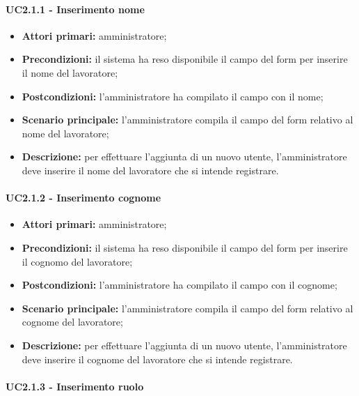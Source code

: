 \paragraph{UC2.1.1 - Inserimento nome}
\begin{itemize}
	\item 	\textbf{Attori primari:} amministratore;
	\item 	\textbf{Precondizioni:} il sistema ha reso disponibile il campo del form per inserire il nome del lavoratore;
	\item 	\textbf{Postcondizioni:} l'amministratore ha compilato il campo con il nome;
	\item 	\textbf{Scenario principale:} l'amministratore compila il campo del form relativo al nome del lavoratore;
	\item 	\textbf{Descrizione:} per effettuare l'aggiunta di un nuovo utente, l'amministratore deve inserire il nome del lavoratore che si intende registrare.

\end{itemize}

\paragraph{UC2.1.2 - Inserimento cognome}

\begin{itemize}
	\item 	\textbf{Attori primari:} amministratore;
	\item 	\textbf{Precondizioni:} il sistema ha reso disponibile il campo del form per inserire il cognomo del lavoratore;
	\item 	\textbf{Postcondizioni:} l'amministratore ha compilato il campo con il cognome;
	\item 	\textbf{Scenario principale:} l'amministratore compila il campo del form relativo al cognome del lavoratore;
	\item 	\textbf{Descrizione:} per effettuare l'aggiunta di un nuovo utente, l'amministratore deve inserire il cognome del lavoratore che si intende registrare.
	
\end{itemize}

\paragraph{UC2.1.3 - Inserimento ruolo}

